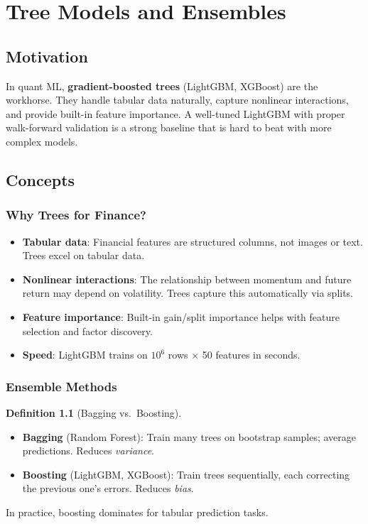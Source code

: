 \documentclass[a4paper, 11pt]{report}
\theoremstyle{definition}
\newtheorem{definition}{Definition}[chapter]
\theoremstyle{remark}
\begin{document}
\chapter{Tree Models and Ensembles}
\label{ch:trees}

\section{Motivation}

In quant ML, \textbf{gradient-boosted trees} (LightGBM, XGBoost) are the
workhorse.  They handle tabular data naturally, capture nonlinear interactions,
and provide built-in feature importance.  A well-tuned LightGBM with proper
walk-forward validation is a strong baseline that is hard to beat with more
complex models.

\section{Concepts}

\subsection{Why Trees for Finance?}

\begin{itemize}
    \item \textbf{Tabular data}: Financial features are structured columns,
          not images or text.  Trees excel on tabular data.
    \item \textbf{Nonlinear interactions}: The relationship between momentum
          and future return may depend on volatility.  Trees capture this
          automatically via splits.
    \item \textbf{Feature importance}: Built-in gain/split importance helps
          with feature selection and factor discovery.
    \item \textbf{Speed}: LightGBM trains on $10^6$ rows $\times$ 50 features
          in seconds.
\end{itemize}

\subsection{Ensemble Methods}

\begin{definition}[Bagging vs.\ Boosting]
    \begin{itemize}
        \item \textbf{Bagging} (Random Forest): Train many trees on bootstrap
              samples; average predictions.  Reduces \emph{variance}.
        \item \textbf{Boosting} (LightGBM, XGBoost): Train trees sequentially,
              each correcting the previous one's errors.  Reduces \emph{bias}.
    \end{itemize}
    In practice, boosting dominates for tabular prediction tasks.
\end{definition}
\end{document}

